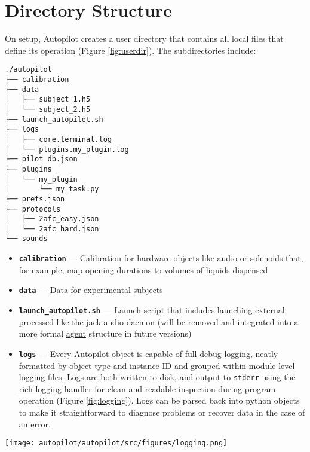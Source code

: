 \section{Directory Structure}
\label{sec:userdir}

On setup, Autopilot creates a user directory that contains all local files that define its operation (Figure \ref{fig:userdir}). The subdirectories include:

\begin{marginfigure}[2.15cm]
\begin{verbatim}
./autopilot
├── calibration
├── data
│   ├── subject_1.h5
│   └── subject_2.h5
├── launch_autopilot.sh
├── logs
│   ├── core.terminal.log
│   └── plugins.my_plugin.log
├── pilot_db.json
├── plugins
│   └── my_plugin
│       └── my_task.py
├── prefs.json
├── protocols
│   ├── 2afc_easy.json
│   └── 2afc_hard.json
└── sounds
\end{verbatim}
\caption{Example user directory structure, typically in \texttt{$\sim$/autopilot}.}
\label{fig:userdir}
\end{marginfigure}

\begin{itemize}
\item \textbf{\texttt{calibration}} --- Calibration for hardware objects like audio or solenoids that, for example, map opening durations to volumes of liquids dispensed
\item \textbf{\texttt{data}} --- \hyperref[sec:datamodel]{Data} for experimental subjects
\item \textbf{\texttt{launch\_autopilot.sh}} --- Launch script that includes launching external processed like the jack audio daemon (will be removed and integrated into a more formal \hyperref[sec:agents]{agent} structure in future versions)
\item \textbf{\texttt{logs}} --- Every Autopilot object is capable of full debug logging, neatly formatted by object type and instance ID and grouped within module-level logging files. Logs are both written to disk, and output to \texttt{stderr} using the \href{https://rich.readthedocs.io/en/latest/reference/logging.html#logging}{rich logging handler} for clean and readable inspection during program operation (Figure \ref{fig:logging}). Logs can be parsed back into python objects to make it straightforward to diagnose problems or recover data in the case of an error.
\end{itemize}
\begin{figure*}
\texttt{[image: autopilot/autopilot/src/figures/logging.png]}
\label{fig:logging}
\caption{Logs printed to \texttt{stderr} are formatted and colorized by the \href{https://rich.readthedocs.io/en/latest/reference/logging.html\#logging}{rich logging handler}. Logfiles are created by module, and log entries are identified by the individual objects instantiated from them. Logfiles are rotated and size-limited for configurable backups.}
\end{figure*}

